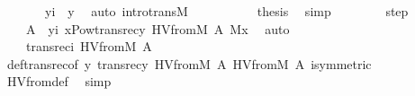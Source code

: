 \begin{isabellebody}
\ \ \ \ \ \ \ {\isachardoublequoteopen}y{\isasymin}i{\isachardoublequoteclose}\ \ y\ \isamarkupfalse%
\ {\isacharparenleft}{\kern0pt}auto\ intro{\isacharcolon}{\kern0pt}transM{\isacharparenright}{\kern0pt}\isanewline
\ \ \ \ \isamarkupfalse%
\isanewline
\ \ \ \ \isamarkupfalse%
\ {\isacharquery}{\kern0pt}thesis\ \isamarkupfalse%
\ simp\isanewline
\ \ \isamarkupfalse%
\isanewline
\ \ \isamarkupfalse%
\ \isamarkupfalse%
\ step\ \isanewline
\ \ \isamarkupfalse%
\ {\isachardoublequoteopen}\ {\isachardot}{\kern0pt}{\isachardot}{\kern0pt}{\isachardot}{\kern0pt}\ {\isacharequal}{\kern0pt}\ A\ {\isasymunion}\ {\isacharparenleft}{\kern0pt}{\isasymUnion}y{\isasymin}i{\isachardot}{\kern0pt}\ {\isacharbraceleft}{\kern0pt}x{\isasymin}Pow{\isacharparenleft}{\kern0pt}transrec{\isacharparenleft}{\kern0pt}y{\isacharcomma}{\kern0pt}\ HVfrom{\isacharparenleft}{\kern0pt}M{\isacharcomma}{\kern0pt}\ A{\isacharparenright}{\kern0pt}{\isacharparenright}{\kern0pt}{\isacharparenright}{\kern0pt}{\isachardot}{\kern0pt}\ M{\isacharparenleft}{\kern0pt}x{\isacharparenright}{\kern0pt}{\isacharbraceright}{\kern0pt}{\isacharparenright}{\kern0pt}{\isachardoublequoteclose}\ \isamarkupfalse%
\ auto\isanewline
\ \ \isamarkupfalse%
\isanewline
\ \ \isamarkupfalse%
\ {\isachardoublequoteopen}\ {\isachardot}{\kern0pt}{\isachardot}{\kern0pt}{\isachardot}{\kern0pt}\ {\isacharequal}{\kern0pt}\ transrec{\isacharparenleft}{\kern0pt}i{\isacharcomma}{\kern0pt}\ HVfrom{\isacharparenleft}{\kern0pt}M{\isacharcomma}{\kern0pt}\ A{\isacharparenright}{\kern0pt}{\isacharparenright}{\kern0pt}{\isachardoublequoteclose}\isanewline
\ \ \ \ \isamarkupfalse%
\ def{\isacharunderscore}{\kern0pt}transrec{\isacharbrackleft}{\kern0pt}of\ {\isachardoublequoteopen}{\isasymlambda}y{\isachardot}{\kern0pt}\ transrec{\isacharparenleft}{\kern0pt}y{\isacharcomma}{\kern0pt}\ HVfrom{\isacharparenleft}{\kern0pt}M{\isacharcomma}{\kern0pt}\ A{\isacharparenright}{\kern0pt}{\isacharparenright}{\kern0pt}{\isachardoublequoteclose}\ {\isachardoublequoteopen}HVfrom{\isacharparenleft}{\kern0pt}M{\isacharcomma}{\kern0pt}\ A{\isacharparenright}{\kern0pt}{\isachardoublequoteclose}\ i{\isacharcomma}{\kern0pt}symmetric{\isacharbrackright}{\kern0pt}\ \isanewline
\ \ \ \ \isamarkupfalse%
\ HVfrom{\isacharunderscore}{\kern0pt}def\ \isamarkupfalse%
\ simp\isanewline
\ \ \isamarkupfalse%

\end{isabellebody}
